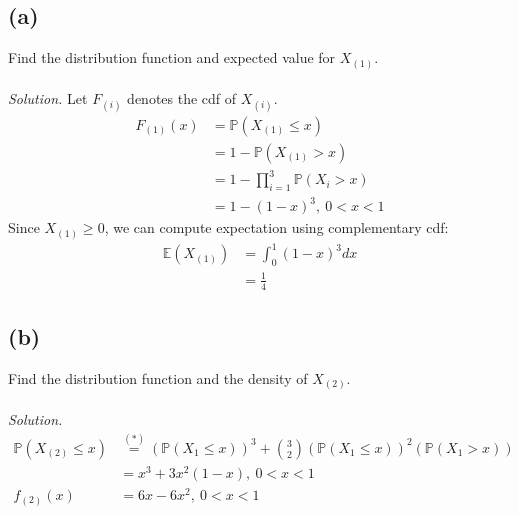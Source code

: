 \documentclass{article}
\newcommand{\prob}{\mathbb{P}}
\newcommand{\E}{\mathbb{E}}
\begin{document}
\subsection*{(a)}
Find the distribution function and expected value for $X_{(1)}$.
\color{blue}
\\\\\textit{Solution. } Let $F_{(i)}$ denotes the cdf of $X_{(i)}$.
\begin{equation*}
    \begin{split}
        F_{(1)}(x) &= \prob(X_{(1)} \leq x)\\
        &= 1-\prob(X_{(1)}>x)\\
        &= 1-\prod_{i=1}^3\prob(X_i>x)\\
        &= 1-(1-x)^3,\ 0<x<1
    \end{split}
\end{equation*}
Since $X_{(1)} \geq 0$, we can compute expectation using complementary cdf: 
\begin{equation*}
    \begin{split}
        \E(X_{(1)})&=\int_0^1(1-x)^3dx\\
        &=\frac{1}{4}
    \end{split}
\end{equation*}
\color{black}
\subsection*{(b)}
Find the distribution function and the density of $X_{(2)}$.
\color{blue}
\\\\\textit{Solution. }
\begin{equation*}
    \begin{split}
        \prob(X_{(2)}\leq x) &\stackrel{(*)}{=}(\prob(X_1\leq x))^3+{3 \choose 2}(\prob(X_1\leq x))^2(\prob(X_1>x))\\
            &=x^3+3x^2(1-x),\ 0<x<1\\
        f_{(2)}(x) &= 6x-6x^2,\ 0<x<1
    \end{split}
\end{equation*}
\end{document}
